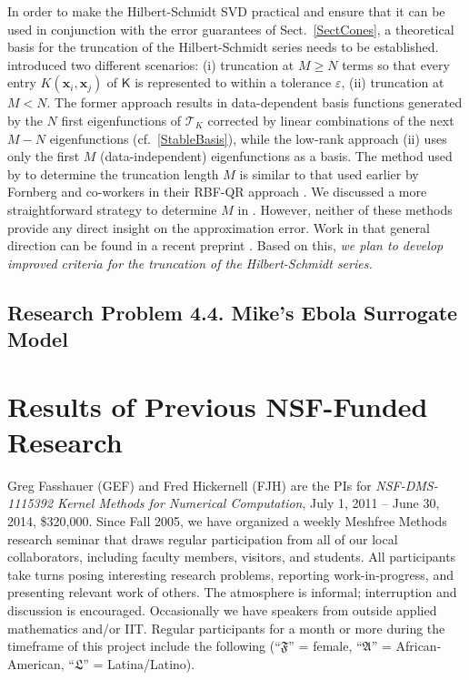 \documentclass[11pt]{NSFamsart}
\newcommand{\mK}{\mathsf{K}}
\newcommand{\bx}{{\boldsymbol{x}}}
\newcommand{\cT}{\mathcal{T}}
\newcommand{\fA}{\mathfrak{A}}
\newcommand{\fF}{\mathfrak{F}}
\newcommand{\fL}{\mathfrak{L}}
\begin{document}
In order to make the Hilbert-Schmidt SVD practical and ensure that it can be used in conjunction with the error guarantees of Sect.~\ref{SectCones}, a theoretical basis for the truncation of the Hilbert-Schmidt series needs to be established. \cite{FMcC12} introduced two different scenarios: (i) truncation at $M\ge N$ terms so that every entry $K(\bx_i,\bx_j)$ of $\mK$ is represented to within a tolerance $\varepsilon$, (ii) truncation at $M < N$. The former approach results in data-dependent basis functions generated by the $N$ first eigenfunctions of $\cT_K$ corrected by linear combinations of the next $M-N$ eigenfunctions (cf.~\eqref{StableBasis}), while the low-rank approach (ii) uses only the first $M$ (data-independent) eigenfunctions as a basis. The method used by \cite{FMcC12} to determine the truncation length $M$ is similar to that used earlier by Fornberg and co-workers in their RBF-QR approach \citep{FornbergPiret08, FornbergFlyerLarsson11}.  We discussed a more straightforward strategy to determine $M$ in \cite{CavorettoEtAl14}. However, neither of these methods provide any direct insight on the approximation error. Work in that general direction can be found in a recent preprint \citep{GriebelRiegerZwicknagl13}. Based on this, \emph{we plan to develop improved criteria for the truncation of the Hilbert-Schmidt series.}

\subsection{Research Problem 4.4. Mike's Ebola Surrogate Model} \label{ebolasubsec}

\section{Results of Previous NSF-Funded Research}\label{SectPrevious}

Greg Fasshauer (GEF) and Fred Hickernell (FJH) are the PIs for \emph{NSF-DMS-1115392 Kernel Methods for Numerical Computation}, July 1, 2011 -- June 30, 2014, \$320,000.  Since Fall 2005, we have organized a weekly Meshfree Methods research seminar that draws regular participation from all of our local collaborators, including faculty members, visitors, and students.  All participants take turns posing interesting research problems, reporting work-in-progress, and presenting relevant work of others.  The atmosphere is informal; interruption and discussion is encouraged.  Occasionally we have speakers from outside applied mathematics and/or IIT. Regular participants for a month or more during the timeframe of this project include the following (``$\fF$'' = female,  ``$\fA$'' = African-American, ``$\fL$'' = Latina/Latino).
\end{document}
